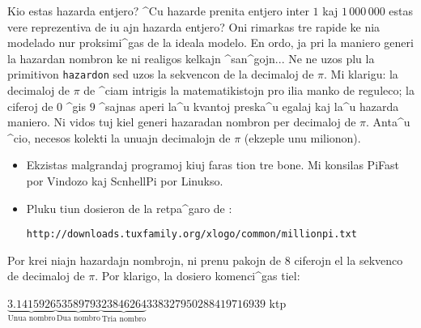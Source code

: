 Kio estas hazarda entjero?  ^Cu hazarde prenita entjero inter $1$ kaj
$1\,000\,000$ estas vere reprezentiva de iu ajn hazarda entjero?  Oni
rimarkas tre rapide ke nia modelado nur proksimi^gas de la ideala
modelo.  En ordo, ja pri la maniero generi la hazardan nombron ke ni
realigos kelkajn ^san^gojn...  Ne ne uzos plu la primitivon
\texttt{hazardon} sed uzos la sekvencon de la decimaloj de $\pi$.  Mi
klarigu: la decimaloj de $\pi$ de ^ciam intrigis la matematikistojn
pro ilia manko de reguleco; la ciferoj de $0$ ^gis $9$ ^sajnas aperi
la^u kvantoj preska^u egalaj kaj la^u hazarda maniero.  Ni vidos tuj
kiel generi hazaradan nombron per decimaloj de $\pi$.  Anta^u ^cio,
necesos kolekti la unuajn decimalojn de $\pi$ (ekzeple unu milionon).
\begin{itemize}
\item Ekzistas malgrandaj programoj kiuj faras tion tre bone.  Mi
  konsilas PiFast por Vindozo kaj ScnhellPi por Linukso.
\item Pluku tiun dosieron de la retpa^garo de \xlogo: 
  \begin{center}
    \texttt{http://downloads.tuxfamily.org/xlogo/common/millionpi.txt} 
  \end{center}
\end{itemize}

Por krei niajn hazardajn nombrojn, ni prenu pakojn de $8$ ciferojn el
la sekvenco de decimaloj de $\pi$.  Por klarigo, la dosiero
komenci^gas tiel:

$\underbrace{3.1415926}_{\textrm{Unua nombro}}\underbrace{53589793}_{\textrm{Dua nombro}}\underbrace{23846264}_{\textrm{Tria nombro}}338327950288419716939$ ktp\\ \\

